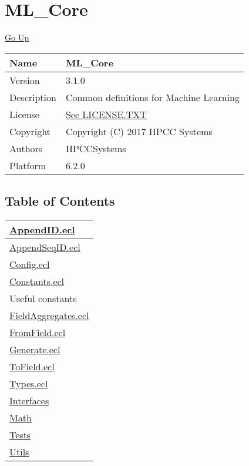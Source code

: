 \chapter*{\color{headtoc} ML\_Core}
\hypertarget{ecldoc:toc:root/ML_Core}{}
\hyperlink{ecldoc:toc:root}{Go Up}

\begin{tabularx}{\textwidth}{|l|X|}
\hline
Name &
ML\_Core
 \\
\hline
Version &
3.1.0
 \\
\hline
Description &
Common definitions for Machine Learning
 \\
\hline
License &
\url{See LICENSE.TXT}
 \\
\hline
Copyright &
Copyright (C) 2017 HPCC Systems
 \\
\hline
Authors &
HPCCSystems
 \\
\hline
Platform &
6.2.0
 \\
\hline
\end{tabularx}

\section*{Table of Contents}
{\renewcommand{\arraystretch}{1.5}
\begin{longtable}{|p{\textwidth}|}
\hline
\hyperlink{ecldoc:toc:ML_Core.AppendID}{AppendID.ecl} \\
\hline
\hyperlink{ecldoc:toc:ML_Core.AppendSeqID}{AppendSeqID.ecl} \\
\hline
\hyperlink{ecldoc:toc:ML_Core.Config}{Config.ecl} \\
\hline
\hyperlink{ecldoc:toc:ML_Core.Constants}{Constants.ecl} \\
Useful constants \\
\hline
\hyperlink{ecldoc:toc:ML_Core.FieldAggregates}{FieldAggregates.ecl} \\
\hline
\hyperlink{ecldoc:toc:ML_Core.FromField}{FromField.ecl} \\
\hline
\hyperlink{ecldoc:toc:ML_Core.Generate}{Generate.ecl} \\
\hline
\hyperlink{ecldoc:toc:ML_Core.ToField}{ToField.ecl} \\
\hline
\hyperlink{ecldoc:toc:ML_Core.Types}{Types.ecl} \\
\hline
\hyperlink{ecldoc:toc:root/ML_Core/Interfaces}{Interfaces} \\
\hline
\hyperlink{ecldoc:toc:root/ML_Core/Math}{Math} \\
\hline
\hyperlink{ecldoc:toc:root/ML_Core/Tests}{Tests} \\
\hline
\hyperlink{ecldoc:toc:root/ML_Core/Utils}{Utils} \\
\hline
\end{longtable}
}














